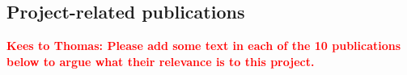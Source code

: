 \documentclass[10pt,fleqn,twoside]{article}
\newcommand{\todo}[1]{\textcolor{red}{\bf #1}}
\newcommand{\Tcol}{\color{blue}}
\begin{document}
\subsection{\Tcol Project-related publications}





\todo{Kees to Thomas: Please add some text in each of the 10 publications
below to argue what their relevance is to this project.}
\end{document}
